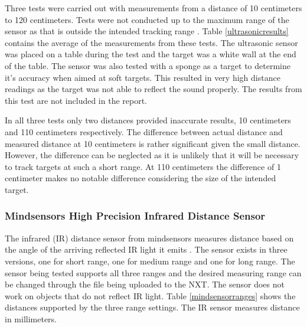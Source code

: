 \noindent
Three tests were carried out with measurements from a distance of 10 centimeters to 120 centimeters. Tests were not conducted up to the maximum range of the sensor as that is outside the intended tracking range . Table \ref{ultrasonicresults} contains the average of the measurements from these tests. The ultrasonic sensor was placed on a table during the test and the target was a white wall at the end of the table. The sensor was also tested with a sponge as a target to determine it's accuracy when aimed at soft targets. This resulted in very high distance readings as the target was not able to reflect the sound properly. The results from this test are not included in the report.


\noindent
In all three tests only two distances provided inaccurate results, 10 centimeters and 110 centimeters respectively. The difference between actual distance and measured distance at 10 centimeters is rather significant given the small distance. However, the difference can be neglected as it is unlikely that it will be necessary to track targets at such a short range. At 110 centimeters the difference of 1 centimeter makes no notable difference considering the size of the intended target.  
\eal

\subsubsection{Mindsensors High Precision Infrared Distance Sensor}\label{ss:minddist}\label{\automlabel}
The infrared (IR) distance sensor from mindsensors measures distance based on the angle of the arriving reflected IR light it emits \cite{minddata}. The sensor exists in three versions, one for short range, one for medium range and one for long range. The sensor being tested supports all three ranges and the desired measuring range can be changed through the file being uploaded to the NXT. The sensor does not work on objects that do not reflect IR light. Table \ref{mindsensorranges} shows the distances supported by the three range settings. The IR sensor measures distance in millimeters. 


\noindent

\eal


